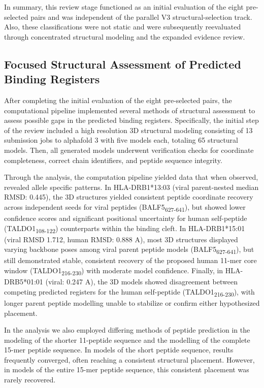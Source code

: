 \documentclass[11pt]{article}
\begin{document}
In summary, this review stage functioned as an initial evaluation of the eight pre-selected pairs and was independent of the parallel V3 structural-selection track. Also, these classifications were not static and were subsequently reevaluated through concentrated structural modeling and the expanded evidence review.

\subsection{Focused Structural Assessment of Predicted Binding Registers}

After completing the initial evaluation of the eight pre-selected pairs, the computational pipeline implemented several methods of structural assessment to assess possible gaps in the predicted binding registers. Specifically, the initial step of the review included a high resolution 3D structural modeling consisting of 13 submission jobs to alphafold 3 with five models each, totaling 65 structural models. Then, all generated models underwent verification checks for coordinate completeness, correct chain identifiers, and peptide sequence integrity.

Through the analysis, the computation pipeline yielded data that when observed, revealed allele specific patterns. In HLA-DRB1*13:03 (viral parent-nested median RMSD: 0.445), the 3D structures yielded consistent peptide coordinate recovery across independent seeds for viral peptides (BALF5\textsubscript{627-641}), but showed lower confidence scores and significant positional uncertainty for human self-peptide (TALDO1\textsubscript{108-122}) counterparts within the binding cleft. In HLA-DRB1*15:01 (viral RMSD 1.712, human RMSD: 0.888 A), most 3D structures displayed varying backbone poses among viral parent peptide models (BALF5\textsubscript{627-641}), but still demonstrated stable, consistent recovery of the proposed human 11-mer core window (TALDO1\textsubscript{216-230}) with moderate model confidence. Finally, in HLA-DRB5*01:01 (viral: 0.247 A), the 3D models showed disagreement between competing predicted registers for the human self-peptide (TALDO1\textsubscript{216-230}), with longer parent peptide modelling unable to stabilize or confirm either hypothesized placement.

In the analysis we also employed differing methods of peptide prediction in the modeling of the shorter 11-peptide sequence and the modelling of the complete 15-mer peptide sequence. In models of the short peptide sequence, results frequently converged, often reaching a consistent structural placement. However, in models of the entire 15-mer peptide sequence, this consistent placement was rarely recovered.
\end{document}
